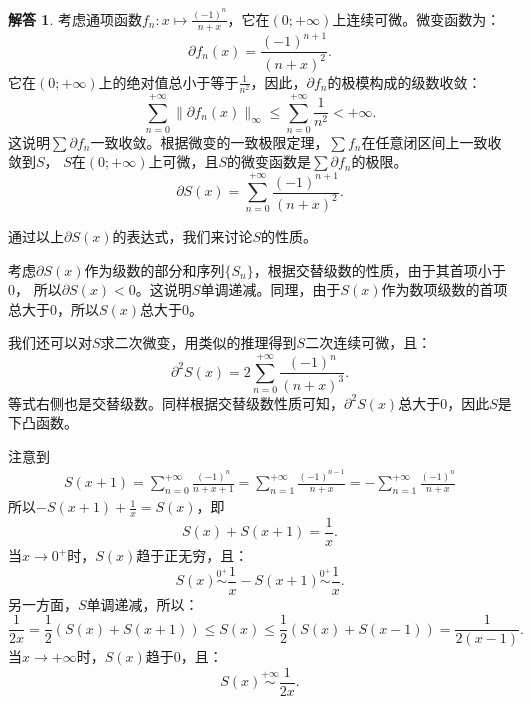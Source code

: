 \documentclass[12pt,UTF8]{ctexbook}
\newcommand{\eqlim}[1]{\overset{#1}{\sim}}  %
\theoremstyle{definition}
\newtheorem*{so}{解答}
\theoremstyle{plain}
\begin{document}
\begin{appendix}
\begin{so}
    考虑通项函数$f_n: x\mapsto \frac{(-1)^n}{n + x}$，它在$(0;+\infty)$上连续可微。微变函数为：
    $$ \partial f_n(x) = \frac{(-1)^{n+1}}{(n + x)^2}. $$
    它在$(0;+\infty)$上的绝对值总小于等于$\frac{1}{n^2}$，因此，$\partial f_n$的极模构成的级数收敛：
    $$ \sum_{n=0}^{+\infty} \| \partial f_n(x) \|_{\infty} \leqslant \sum_{n=0}^{+\infty} \frac{1}{n^2} < +\infty .$$
    这说明$\sum \partial f_n$一致收敛。根据微变的一致极限定理，$\sum f_n$在任意闭区间上一致收敛到$S$，
    $S$在$(0;+\infty)$上可微，且$S$的微变函数是$\sum \partial f_n$的极限。
    $$ \partial S(x) = \sum_{n=0}^{+\infty} \frac{(-1)^{n+1}}{(n + x)^2}. $$

    通过以上$\partial S(x)$的表达式，我们来讨论$S$的性质。

    考虑$\partial S(x)$作为级数的部分和序列$\{S_n\}$，根据交替级数的性质，由于其首项小于$0$，
    所以$\partial S(x) < 0$。这说明$S$单调递减。同理，由于$S(x)$作为数项级数的首项总大于$0$，所以$S(x)$总大于$0$。

    我们还可以对$S$求二次微变，用类似的推理得到$S$二次连续可微，且：
    $$ \partial^2 S(x) = 2\sum_{n=0}^{+\infty} \frac{(-1)^{n}}{(n + x)^3}. $$
    等式右侧也是交替级数。同样根据交替级数性质可知，$\partial^2 S(x)$总大于$0$，因此$S$是下凸函数。

    注意到
    \begin{align*}
        S(x + 1) = \sum_{n=0}^{+\infty} \frac{(-1)^n}{n + x + 1} = \sum_{n=1}^{+\infty} \frac{(-1)^{n-1}}{n + x} = -\sum_{n=1}^{+\infty} \frac{(-1)^{n}}{n + x}
    \end{align*}
    所以$- S(x + 1) + \frac{1}{x} = S(x)$，即
    $$ S(x) + S(x + 1) = \frac{1}{x}.$$
    当$x\to 0^+$时，$S(x)$趋于正无穷，且：
    $$ S(x) \eqlim{0^+} \frac{1}{x} - S(x + 1) \eqlim{0^+} \frac{1}{x}.  $$
    另一方面，$S$单调递减，所以：
    $$ \frac{1}{2x} = \frac{1}{2}\left(S(x) + S(x + 1)\right) \leqslant S(x) \leqslant \frac{1}{2}\left(S(x) + S(x - 1)\right) = \frac{1}{2(x - 1)}.$$
    当$x\to +\infty$时，$S(x)$趋于$0$，且：
    $$ S(x) \eqlim{+\infty} \frac{1}{2x}. $$

\end{so}


\end{appendix}
\end{document}
